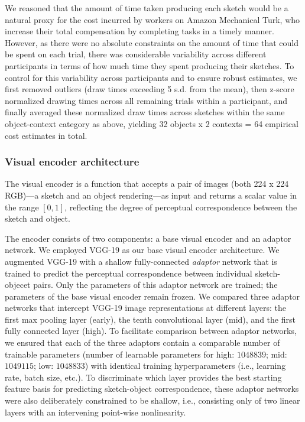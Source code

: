 \documentclass[9pt,twocolumn,twoside]{pnas-new}
\begin{document}
{%
We reasoned that the amount of time taken producing each sketch would be a natural proxy for the cost incurred by workers on Amazon Mechanical Turk, who increase their total compensation by completing tasks in a timely manner. 
However, as there were no absolute constraints on the amount of time that could be spent on each trial, there was considerable variability across different participants in terms of how much time they spent producing their sketches. 
To control for this variability across participants and to ensure robust estimates, we first removed outliers (draw times exceeding 5 s.d. from the mean), then z-score normalized drawing times across all remaining trials within a participant, and finally averaged these normalized draw times across sketches within the same object-context category as above, yielding 32 objects x 2 contexts = 64 empirical cost estimates in total.

\subsubsection*{Visual encoder architecture}

The visual encoder is a function that accepts a pair of images (both 224 x 224 RGB)---a sketch and an object rendering---as input and returns a scalar value in the range $[0,1]$, reflecting the degree of perceptual correspondence between the sketch and object. 

The encoder consists of two components: a base visual encoder and an adaptor network. 
We employed VGG-19 \cite{simonyan2014very} as our base visual encoder architecture.
We augmented VGG-19 with a shallow fully-connected \textit{adaptor} network that is trained to predict the perceptual correspondence between individual sketch-objecet pairs. 
Only the parameters of this adaptor network are trained; the parameters of the base visual encoder remain frozen. 
We compared three adaptor networks that intercept VGG-19 image representations at different layers: the first max pooling layer (early), the tenth convolutional layer (mid), and the first fully connected layer (high). 
To facilitate comparison between adaptor networks, we ensured that each of the three adaptors contain a comparable number of trainable parameters (number of learnable parameters for high: $1048839$; mid: $1049115$; low: $1048833$) with identical training hyperparameters (i.e., learning rate, batch size, etc.). 
To discriminate which layer provides the best starting feature basis for predicting sketch-object correspondence, these adaptor networks were also deliberately constrained to be shallow, i.e., consisting only of two linear layers with an intervening point-wise nonlinearity.

}
\end{document}
